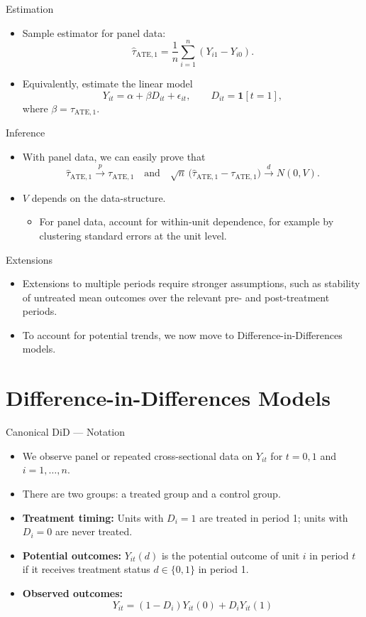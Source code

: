 \documentclass[11pt,aspectratio=169]{beamer}
\newcommand{\ind}{\mathbf{1}}
\begin{document}
\begin{frame}{Estimation}
\begin{itemize}
  \item Sample estimator for panel data:
  \[\widehat\tau_{\text{ATE},1}=\frac{1}{n}\sum_{i=1}^n(Y_{i1}-Y_{i0}).\]
  \item Equivalently, estimate the linear model
  \[Y_{it}=\alpha+\beta D_{it}+\epsilon_{it},\qquad D_{it}=\ind[t=1],\]
  where $\beta=\tau_{\text{ATE},1}$.
\end{itemize}
\end{frame}

\begin{frame}{Inference}
\begin{itemize}
  \item With panel data, we can easily prove that
  \[\widehat\tau_{\text{ATE},1}\xrightarrow{p}\tau_{\text{ATE},1}
    \quad\text{and}\quad
    \sqrt{n}\,\bigl(\widehat\tau_{\text{ATE},1}-\tau_{\text{ATE},1}\bigr)\xrightarrow{d}N(0,V).\]
  \item $V$ depends on the data-structure.
  \begin{itemize}
    \item For panel data, account for within-unit dependence, for example by clustering standard errors at the unit level.
  \end{itemize}
\end{itemize}
\end{frame}

\begin{frame}{Extensions}
\begin{itemize}
  \item Extensions to multiple periods require stronger assumptions, such as stability of untreated mean outcomes over the relevant pre- and post-treatment periods.
  \item To account for potential trends, we now move to Difference-in-Differences models.
\end{itemize}
\end{frame}


\section{Difference-in-Differences Models}

\begin{frame}{Canonical DiD --- Notation}
\begin{itemize}
  \item We observe panel or repeated cross-sectional data on $Y_{it}$ for $t=0,1$ and $i=1,\dots,n$.
  \item There are two groups: a treated group and a control group.
  \item \textbf{Treatment timing:} Units with $D_i=1$ are treated in period 1; units with $D_i=0$ are never treated.
  \item \textbf{Potential outcomes:} $Y_{it}(d)$ is the potential outcome of unit $i$ in period $t$ if it receives treatment status $d\in\{0,1\}$ in period 1.
  \item \textbf{Observed outcomes:}
  \[Y_{it}=(1-D_i)Y_{it}(0)+D_iY_{it}(1)\]
\end{itemize}
\end{frame}
\end{document}
